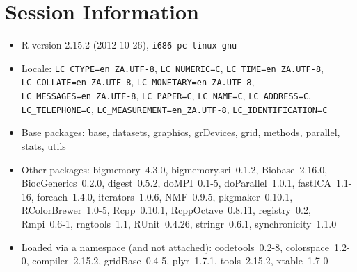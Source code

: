 \documentclass[10pt]{article}
\begin{document}
\section*{Session Information}
\begin{itemize}\raggedright
  \item R version 2.15.2 (2012-10-26), \verb|i686-pc-linux-gnu|
  \item Locale: \verb|LC_CTYPE=en_ZA.UTF-8|, \verb|LC_NUMERIC=C|, \verb|LC_TIME=en_ZA.UTF-8|, \verb|LC_COLLATE=en_ZA.UTF-8|, \verb|LC_MONETARY=en_ZA.UTF-8|, \verb|LC_MESSAGES=en_ZA.UTF-8|, \verb|LC_PAPER=C|, \verb|LC_NAME=C|, \verb|LC_ADDRESS=C|, \verb|LC_TELEPHONE=C|, \verb|LC_MEASUREMENT=en_ZA.UTF-8|, \verb|LC_IDENTIFICATION=C|
  \item Base packages: base, datasets, graphics, grDevices, grid,
    methods, parallel, stats, utils
  \item Other packages: bigmemory~4.3.0, bigmemory.sri~0.1.2,
    Biobase~2.16.0, BiocGenerics~0.2.0, digest~0.5.2, doMPI~0.1-5,
    doParallel~1.0.1, fastICA~1.1-16, foreach~1.4.0, iterators~1.0.6,
    NMF~0.9.5, pkgmaker~0.10.1, RColorBrewer~1.0-5, Rcpp~0.10.1,
    RcppOctave~0.8.11, registry~0.2, Rmpi~0.6-1, rngtools~1.1,
    RUnit~0.4.26, stringr~0.6.1, synchronicity~1.1.0
  \item Loaded via a namespace (and not attached): codetools~0.2-8,
    colorspace~1.2-0, compiler~2.15.2, gridBase~0.4-5, plyr~1.7.1,
    tools~2.15.2, xtable~1.7-0
\end{itemize}
\end{document}
